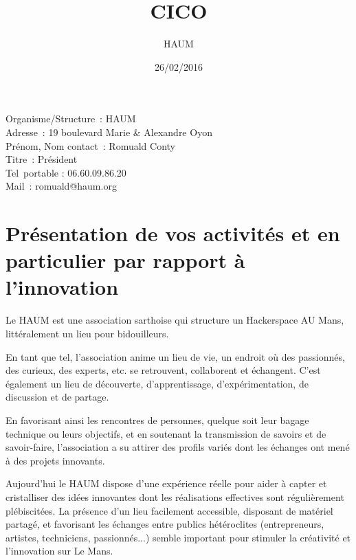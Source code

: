 \documentclass[a4paper,10pt]{scrartcl}
\title{CICO}
\author{HAUM}
\date{26/02/2016}
\begin{document}
\maketitle

\hfill
{}

\begin{minipage}{10cm}
Organisme/Structure : HAUM\\
Adresse : 19 boulevard Marie \& Alexandre Oyon\\
Prénom, Nom contact : Romuald Conty\\
Titre : Président\\
Tel portable : 06.60.09.86.20\\
Mail : romuald@haum.org\\
\end{minipage}


\section{Présentation de vos activités et en particulier par rapport à l’innovation}

Le HAUM est une association sarthoise qui structure un Hackerspace AU Mans, littéralement un lieu pour bidouilleurs.

En tant que tel, l'association anime un lieu de vie, un endroit où des passionnés, des curieux, des experts, etc. se retrouvent, collaborent et échangent. C'est également un lieu de découverte, d'apprentissage, d'expérimentation, de discussion et de partage.

En favorisant ainsi les rencontres de personnes, quelque soit leur bagage technique ou leurs objectifs, et en soutenant la transmission de savoirs et de savoir-faire, l'association a su attirer des profils variés dont les échanges ont mené à des projets innovants.

Aujourd'hui le HAUM dispose d'une expérience réelle pour aider à capter et cristalliser des idées innovantes dont les réalisations effectives sont régulièrement plébiscitées. La présence d'un lieu facilement accessible, disposant de matériel partagé, et favorisant les échanges entre publics hétéroclites (entrepreneurs, artistes, techniciens, passionnés...) semble important pour stimuler la créativité et l'innovation sur Le Mans. 
\end{document}
